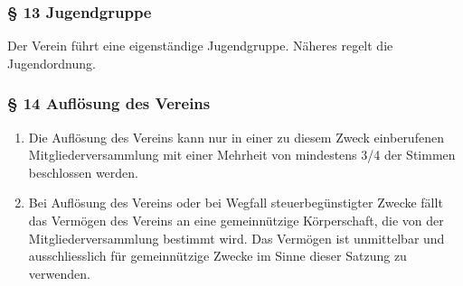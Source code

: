 \documentclass[a4paper,10pt]{article}
\begin{document}
\subsubsection*{§ 13 Jugendgruppe}
Der Verein führt eine eigenständige Jugendgruppe. Näheres regelt die
Jugendordnung.

\newpage

\subsubsection*{§ 14 Auflösung des Vereins}
\begin{enumerate}
  \item Die Auflösung des Vereins kann nur in einer zu diesem Zweck einberufenen
Mitgliederversammlung mit einer Mehrheit von mindestens 3/4 der Stimmen
beschlossen werden.
\item Bei Auflösung des Vereins oder bei Wegfall steuerbegünstigter Zwecke fällt das
Vermögen des Vereins an eine gemeinnützige Körperschaft, die von der
Mitgliederversammlung bestimmt wird. Das Vermögen ist unmittelbar und
ausschliesslich für gemeinnützige Zwecke im Sinne dieser Satzung zu verwenden.
\end{enumerate}
\end{document}
